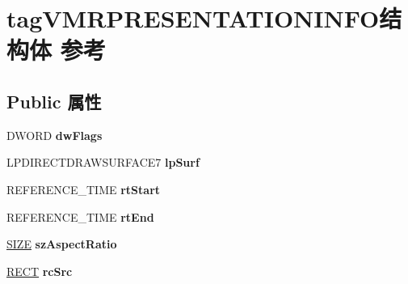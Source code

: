 \hypertarget{structtag_v_m_r_p_r_e_s_e_n_t_a_t_i_o_n_i_n_f_o}{}\section{tag\+V\+M\+R\+P\+R\+E\+S\+E\+N\+T\+A\+T\+I\+O\+N\+I\+N\+F\+O结构体 参考}
\label{structtag_v_m_r_p_r_e_s_e_n_t_a_t_i_o_n_i_n_f_o}
\subsection*{Public 属性}
\begin{DoxyCompactItemize}
\item 
\mbox{\label{structtag_v_m_r_p_r_e_s_e_n_t_a_t_i_o_n_i_n_f_o_aa445127f46ae919469dd5b944c59e68d}} 
D\+W\+O\+RD {\bfseries dw\+Flags}
\item 
\mbox{\label{structtag_v_m_r_p_r_e_s_e_n_t_a_t_i_o_n_i_n_f_o_a6eb7065011e953cf360bbf8563a8d2a4}} 
L\+P\+D\+I\+R\+E\+C\+T\+D\+R\+A\+W\+S\+U\+R\+F\+A\+C\+E7 {\bfseries lp\+Surf}
\item 
\mbox{\label{structtag_v_m_r_p_r_e_s_e_n_t_a_t_i_o_n_i_n_f_o_abf39f8321720cebdb9179223f6550d95}} 
R\+E\+F\+E\+R\+E\+N\+C\+E\+\_\+\+T\+I\+ME {\bfseries rt\+Start}
\item 
\mbox{\label{structtag_v_m_r_p_r_e_s_e_n_t_a_t_i_o_n_i_n_f_o_af8e3345294329b24f1c6cf655bb5c8ae}} 
R\+E\+F\+E\+R\+E\+N\+C\+E\+\_\+\+T\+I\+ME {\bfseries rt\+End}
\item 
\mbox{\label{structtag_v_m_r_p_r_e_s_e_n_t_a_t_i_o_n_i_n_f_o_a8c7e4e07c5b2e168ce8c2fa6d0fcddc1}} 
\hyperlink{structtag_s_i_z_e}{S\+I\+ZE} {\bfseries sz\+Aspect\+Ratio}
\item 
\mbox{\label{structtag_v_m_r_p_r_e_s_e_n_t_a_t_i_o_n_i_n_f_o_a20dad88d254ba6697d3835e303fb7036}} 
\hyperlink{structtag_r_e_c_t}{R\+E\+CT} {\bfseries rc\+Src}
\item 
\mbox{\label{structtag_v_m_r_p_r_e_s_e_n_t_a_t_i_o_n_i_n_f_o_acc19801a882d8961fe7c4df498621420}} 

\end{DoxyCompactItemize}
